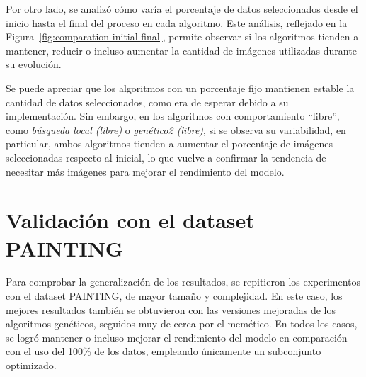 Por otro lado, se analizó cómo varía el porcentaje de datos seleccionados desde el inicio hasta el final del proceso en cada algoritmo.
Este análisis, reflejado en la Figura~\ref{fig:comparation-initial-final}, permite observar si los algoritmos tienden a mantener,
reducir o incluso aumentar la cantidad de imágenes utilizadas durante su evolución.


Se puede apreciar que los algoritmos con un porcentaje fijo mantienen estable la cantidad de datos seleccionados, como era de esperar debido a su implementación.
Sin embargo, en los algoritmos con comportamiento “libre”, como \textit{búsqueda local (libre)} o \textit{genético2 (libre)}, si se observa su variabilidad,
en particular, ambos algoritmos tienden a aumentar el porcentaje de imágenes seleccionadas respecto al inicial,
lo que vuelve a confirmar la tendencia de necesitar más imágenes para mejorar el rendimiento del modelo.


\section{Validación con el dataset PAINTING}\label{sec:validacion-con-el-dataset-painting}
Para comprobar la generalización de los resultados, se repitieron los experimentos con el dataset PAINTING, de mayor tamaño y complejidad.
En este caso, los mejores resultados también se obtuvieron con las versiones mejoradas de los algoritmos genéticos, seguidos muy de cerca por el memético.
En todos los casos, se logró mantener o incluso mejorar el rendimiento del modelo en comparación con el uso del 100\% de los datos, empleando únicamente
un subconjunto optimizado.